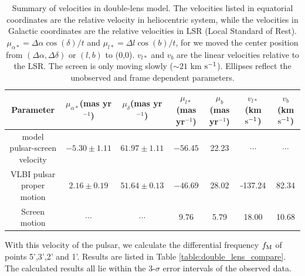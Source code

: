 \documentclass[useAMS,usenatbib]{mn2e}
\begin{document}
\begin{table}
\centering
\begin{tabular}{c|cccccc}
\hline
Parameter & $\mu_{\alpha*}$(mas yr$^{-1}$) & $\mu_{\delta}$(mas yr$^{-1}$) & $\mu_{l*}$(mas yr$^{-1}$) & $\mu_b$ (mas yr$^{-1}$) & $v_{l*}$ (km $\rm s^{-1}$) & $v_b$ (km $\rm s^{-1}$) \\
\hline
model pulsar-screen velocity & $-5.30 \pm 1.11$  & $61.97 \pm 1.11$  & $-56.45$ & 22.23 &  $\cdots$ & $\cdots$\\
VLBI pulsar proper motion & $2.16 \pm 0.19$ & $51.64 \pm 0.13$ & $-46.69$ & 28.02 & -137.24 & 82.34 \\
Screen motion & $\cdots$ & $\cdots$  & 9.76 & 5.79 & 18.00 & 10.68\\
\hline
\end{tabular}
\caption{Summary of velocities in double-lens model. The velocities
listed in equatorial coordinates are the relative velocity in
heliocentric system, while the velocities in Galactic coordinates are
the relative velocities in LSR (Local Standard of Rest). $\mu_{\alpha*}=\Delta\alpha\cos(\delta)/t$ and $\mu_{l*}=\Delta l\cos(b)/t$, for we moved the center position from $(\Delta\alpha,\Delta\delta)$ or $(l,b)$ to (0,0). $v_{l*}$ and $v_b$ are the linear velocities relative to the LSR. The screen is
only moving slowly ($\sim 21$ km $\rm s^{-1}$). Ellipses reflect the
unobserved and frame dependent parameters.
}
\label{Table:velocity}
\end{table}





With this velocity of the pulsar, we calculate the differential frequency $f_{\rm M}$ of points 5',3',2' and 1'. Results are listed in Table \ref{table:double_lens_compare}. The calculated results all lie within the 3-$\sigma$ error intervals of the observed data. 
\end{document}

